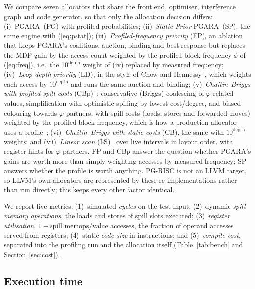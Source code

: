 \documentclass{ieeeaccess}
\newcommand{\MG}{PGARA}
\begin{document}
We compare seven allocators that share the front end, optimiser,
interference graph and code generator, so that only the allocation
decision differs:
(i)~\MG\ (PG) with profiled probabilities;
(ii)~\emph{Static-Prior} \MG\ (SP), the same engine with (\ref{eq:pstat});
(iii)~\emph{Profiled-frequency priority} (FP), an ablation that keeps
\MG's coalitions, auction, binding and best response but replaces the
MDP gain by the access count weighted by the profiled block frequency
$\phi$ of (\ref{eq:freq}), i.e.\ the 10$^{\text{depth}}$ weight of
(iv) replaced by measured frequency;
(iv)~\emph{Loop-depth priority} (LD), in the style of Chow and
Hennessy~\cite{chow1990}, which weights each access by $10^{\text{depth}}$
and runs the same auction and binding;
(v)~\emph{Chaitin--Briggs with profiled spill costs}
(CBp)~\cite{chaitin1982,briggs1994}: conservative (Briggs) coalescing of
$\varphi$-related values, simplification with optimistic spilling by
lowest cost/degree, and biased colouring towards $\varphi$ partners,
with spill costs (loads, stores and forwarded moves) weighted by the
profiled block frequency, which is how a production allocator uses a
profile~\cite{olesen2011greedy};
(vi)~\emph{Chaitin--Briggs with static costs} (CB), the same with
$10^{\text{depth}}$ weights; and
(vii)~\emph{Linear scan} (LS)~\cite{poletto1999} over live intervals in
layout order, with register hints for $\varphi$ partners.
FP and CBp answer the question whether \MG's gains are worth more than
simply weighting accesses by measured frequency; SP answers whether the
profile is worth anything. PG-RISC is not an LLVM target, so LLVM's own
allocators are represented by these re-implementations rather than run
directly; this keeps every other factor identical.

We report five metrics: (1)~simulated \emph{cycles} on the test input;
(2)~dynamic \emph{spill memory operations}, the loads and stores of
spill slots executed; (3)~\emph{register utilisation},
$1-\text{spill memops}/\text{value accesses}$, the fraction of operand
accesses served from registers; (4)~static \emph{code size} in
instructions; and (5)~\emph{compile cost}, separated into the profiling
run and the allocation itself (Table~\ref{tab:bench} and
Section~\ref{sec:cost}).

\subsection{Execution time}
\end{document}
